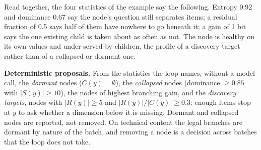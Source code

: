 Read together, the four statistics of the example say the following.
Entropy 0.92 and dominance 0.67 say the node's question still separates
items; a residual fraction of 0.5 says half of them have nowhere to go
beneath it; a gain of 1 bit says the one existing child is taken about as
often as not. The node is healthy on its own values and under-served by
children, the profile of a discovery target rather than of a collapsed or
dormant one.

\textbf{Deterministic proposals.} From the statistics the loop names, without
a model call, the \emph{dormant} nodes ($C(y) = \emptyset$), the
\emph{collapsed} nodes (dominance $\ge 0.85$ with $|S(y)| \ge 10$), the nodes
of highest branching gain, and the \emph{discovery targets}, nodes with
$|R(y)| \ge 5$ and $|R(y)|/|C(y)| \ge 0.3$: enough items stop at $y$ to ask
whether a dimension below it is missing. Dormant and collapsed nodes are
reported, not removed. On technical content the legal branches are dormant by
nature of the batch, and removing a node is a decision across batches that
the loop does not take.

